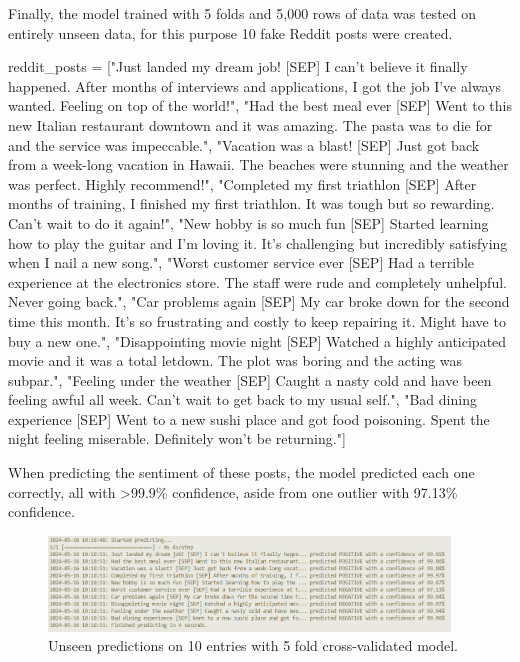     Finally, the model trained with 5 folds and 5,000 rows of data was tested on entirely unseen data, for this purpose 10 fake Reddit posts were created.

    \begin{python}
reddit_posts = ["Just landed my dream job! [SEP] I can't believe it finally happened. After months of interviews and applications, I got the job I've always wanted. Feeling on top of the world!",
"Had the best meal ever [SEP] Went to this new Italian restaurant downtown and it was amazing. The pasta was to die for and the service was impeccable.",
"Vacation was a blast! [SEP] Just got back from a week-long vacation in Hawaii. The beaches were stunning and the weather was perfect. Highly recommend!",
"Completed my first triathlon [SEP] After months of training, I finished my first triathlon. It was tough but so rewarding. Can't wait to do it again!",
"New hobby is so much fun [SEP] Started learning how to play the guitar and I'm loving it. It's challenging but incredibly satisfying when I nail a new song.",
"Worst customer service ever [SEP] Had a terrible experience at the electronics store. The staff were rude and completely unhelpful. Never going back.",
"Car problems again [SEP] My car broke down for the second time this month. It's so frustrating and costly to keep repairing it. Might have to buy a new one.",
"Disappointing movie night [SEP] Watched a highly anticipated movie and it was a total letdown. The plot was boring and the acting was subpar.",
"Feeling under the weather [SEP] Caught a nasty cold and have been feeling awful all week. Can't wait to get back to my usual self.",
"Bad dining experience [SEP] Went to a new sushi place and got food poisoning. Spent the night feeling miserable. Definitely won't be returning."]
    \end{python}

    When predicting the sentiment of these posts, the model predicted each one correctly, all with >99.9\% confidence, aside from one outlier with 97.13\% confidence.

    \FloatBarrier
    \begin{figure}[h]
        \centering
        \includegraphics[width=0.95\textwidth]{figures/cross_validation_5000_predictions.png}
        \caption{Unseen predictions on 10 entries with 5 fold cross-validated model.}
    \end{figure}
    \FloatBarrier

